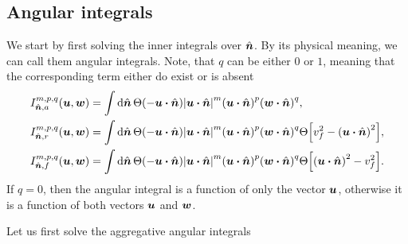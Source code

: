 \documentclass[aps,prl,preprint,groupedaddress,10pt]{revtex4-2}
\begin{document}
\subsection{Angular integrals}
We start by first solving the inner integrals over $\hat{\vb*{n}}$. By its physical meaning, we can call
them angular integrals. Note, that $q$ can be either $0$ or $1$, meaning that the
corresponding term either do exist or is absent
\begin{equation}
    \begin{split}
        I_{\bn,a}^{m,p,q}\pqty{\bu,\bw}&=\int\dd{\bn}\Theta\pqty{-\bu\vdot\bn}
        \abs{\bu\vdot\bn}^m\pqty{\bu\vdot\bn}^p\pqty{\bw\vdot\bn}^q,\\
        I_{\bn,r}^{m,p,q}\pqty{\bu,\bw}&=\int\dd{\bn}\Theta\pqty{-\bu\vdot\bn}
        \abs{\bu\vdot\bn}^m\pqty{\bu\vdot\bn}^p\pqty{\bw\vdot\bn}^q
        \Theta\bqty{v_f^2-\pqty{\bu\vdot\bn}^2},\\
        I_{\bn,f}^{m,p,q}\pqty{\bu,\bw}&=\int\dd{\bn}\Theta\pqty{-\bu\vdot\bn}
        \abs{\bu\vdot\bn}^m\pqty{\bu\vdot\bn}^p\pqty{\bw\vdot\bn}^q
        \Theta\bqty{\pqty{\bu\vdot\bn}^2-v_f^2}.\\
    \end{split}
\end{equation}
If $q=0$, then the angular integral is a function of only the vector $\vb*{u}$, otherwise it is
a function of both vectors $\vb*{u}$ and $\vb*{w}$.

Let us first solve the aggregative angular integrals
\end{document}
